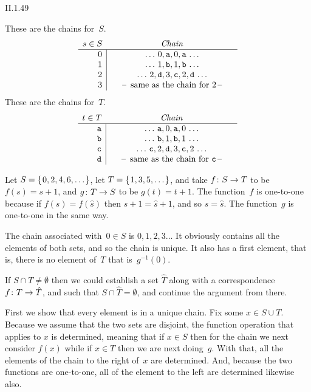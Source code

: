 %
\begin{ans}{II.1.49}
\begin{exparts}
\item These are the chains for~$S$.
\begin{equation*}
\begin{array}{r|c}
  \multicolumn{1}{r}{s\in S}
  &\text{\makebox[2in][c]{\tabulartext{Chain}}}  \\ \hline
  0 &  \ldots\,0,\str{a},0,\str{a}\,\ldots   \\
  1 &  \ldots\,1,\str{b},1,\str{b}\,\ldots    \\
  2 &  \ldots\,2,\str{d},3,\str{c},2,\str{d}\,\ldots\\
  3 &  \text{--\, same as the chain for $2$\,--}
\end{array}
\end{equation*}
These are the chains for~$T$.
\begin{equation*}
\begin{array}{r|c}
  \multicolumn{1}{r}{t\in T}
  &\text{\makebox[2in][c]{\tabulartext{Chain}}}  \\ \hline
  \str{a} &  \ldots\,\str{a},0,\str{a},0\,\ldots   \\
  \str{b} &  \ldots\,\str{b},1,\str{b},1\,\ldots    \\
  \str{c} &  \ldots\,\str{c},2,\str{d},3,\str{c},2\,\ldots\\
  \str{d} &  \text{--\, same as the chain for \str{c}\,--}
\end{array}
\end{equation*}
\item Let $S=\set{0,2,4,6,\ldots}$, let $T=\set{1,3,5,\ldots}$,
and take $\mbox{$f\colon S\to T$}$ to be $f(s)=s+1$, and
$\mbox{$g\colon T\to S$}$ to be $g(t)=t+1$.
The function~$f$ is one-to-one because if $f(s)=f(\hat{s})$ then
$s+1=\hat{s}+1$, and so $s=\hat{s}$.
The function~$g$ is one-to-one in the same way.

The chain associated with~$0\in S$ is
$0,1,2,3\ldots$\@
It obviously contains all the elements of both sets, and so the chain is unique.
It also has a first element, that is, there is no element of~$T$
that is~$g^{-1}(0)$.
\item If $S\cap T\neq\emptyset$ then we could establish a set $\hat{T}$
along with a correspondence $\mbox{$f\colon T\to \hat{T}$}$, and such that
$S\cap\hat{T}=\emptyset$, and continue the argument from there.
\item First we show that every element is in a unique chain.
Fix some $x\in S\cup T$.
Because we assume that the two sets are disjoint, the function operation that
applies to $x$ is determined, meaning that if $x\in S$ then for the chain
we next consider $f(x)$ while if $x\in T$ then we are next doing~$g$.
With that, all the elements of the chain to the right of~$x$ are determined.
And, because the two functions are one-to-one, all of the
element to the left are determined likewise also.


\end{exparts}
\end{ans}
